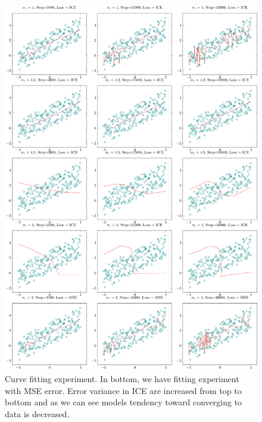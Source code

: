 \documentclass[conference]{IEEEtran}
\begin{document}
\begin{figure}
    \center
    \includegraphics[width=0.85\linewidth]{./fig/expriments/out/exp.pdf}
    \caption{
        Curve fitting experiment. In bottom, we have fitting experiment with MSE error.
        Error variance in ICE are increased from top to bottom and as we can see models tendency toward converging to data is decreased.
    }
    \label{fig:fit}
\end{figure}




\end{document}
